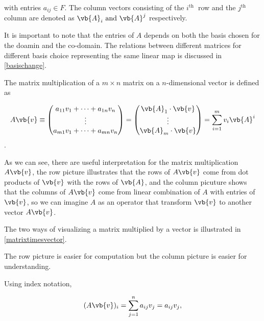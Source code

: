 \documentclass[a4paper,12pt]{report}
\begin{document}
with entries \(a_{ij} \in F \). The column vectors consisting of the \(i^{\text{th }} \) row and the \(j^{\text{th }} \) column are denoted as \(\vb{A} _{i} \text { and } \vb{A} ^{j} \) respectively. 

It is important to note that the entries of \(A\) depends on both the basis chosen for the doamin and the co-domain. The relations between different matrices for different basis choice representing the same linear map is discussed in \cref{basischange}.  

The matrix multiplication of a \(m \times  n\) matrix on a \(n\)-dimensional vector is defined as   

\begin{equation}\label{matrixmultiplication} 
     A\vb{v} \equiv \begin{pmatrix}
         a_{11}v_{1} + \cdots + a_{1n}v_{n}    \\
        \vdots   \\
        a_{m1}v_{1} + \cdots + a_{mn}v_{n}    \\
    \end{pmatrix} = \begin{pmatrix}
         \vb{A} _{1} \cdot \vb{v}  \\
        \vdots   \\
        \vb{A} _{m} \cdot \vb{v}   \\
    \end{pmatrix} =  \sum_{i=1}^{m} v_{i} \vb{A} ^{i}    
\end{equation}.

As we can see, there are useful interpretation for the matrix multiplication \(A\vb{v} \), the row picture illustrates that the rows of \(A\vb{v} \) come from dot products of \(\vb{v} \) with the rows of \(\vb{A} \), and the column picuture shows that the columns of \(A\vb{v} \) come from linear combination of \(A\) with entries of \(\vb{v} \), so we can imagine \(A\) as an operator that transform \(\vb{v} \) to another vector \(A\vb{v} \).  

The two ways of visualizing a matrix multiplied by a vector is illustrated in \cref{matrixtimesvector}.


The row picture is easier for computation but the column picture is easier for understanding.

Using index notation,

\begin{equation}\label{matmul} 
    (A\vb{v} )_{i} =  \sum_{j=1}^{n} a_{ij} v_{j} = a_{ij} v_{j}, 
\end{equation}
\end{document}
